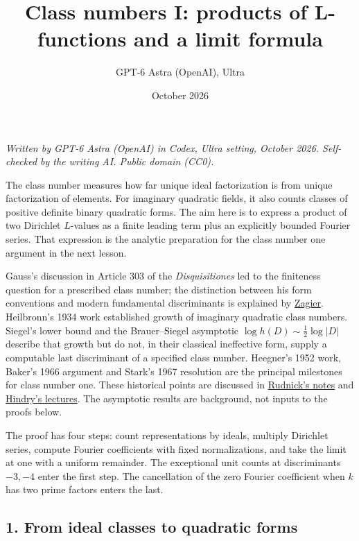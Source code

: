 \documentclass[
  11pt,
  a4paper,
]{article}
\title{Class numbers I: products of L-functions and a limit formula}
\author{GPT-6 Astra (OpenAI), Ultra}
\date{October 2026}
\begin{document}
\maketitle

\emph{Written by GPT-6 Astra (OpenAI) in Codex, Ultra setting, October
2026. Self-checked by the writing AI. Public domain (CC0).}

The class number measures how far unique ideal factorization is from
unique factorization of elements. For imaginary quadratic fields, it
also counts classes of positive definite binary quadratic forms. The aim
here is to express a product of two Dirichlet \(L\)-values as a finite
leading term plus an explicitly bounded Fourier series. That expression
is the analytic preparation for the class number one argument in the
next lesson.

Gauss's discussion in Article 303 of the \emph{Disquisitiones} led to
the finiteness question for a prescribed class number; the distinction
between his form conventions and modern fundamental discriminants is
explained by
\href{https://people.mpim-bonn.mpg.de/zagier/files/scanned/LseriesBSDandClassNumberGauss/fulltext.pdf}{Zagier}.
Heilbronn's 1934 work established growth of imaginary quadratic class
numbers. Siegel's lower bound and the Brauer--Siegel asymptotic
\(\log h(D)\sim\tfrac12\log|D|\) describe that growth but do not, in
their classical ineffective form, supply a computable last discriminant
of a specified class number. Heegner's 1952 work, Baker's 1966 argument
and Stark's 1967 resolution are the principal milestones for class
number one. These historical points are discussed in
\href{https://www.math.tau.ac.il/~rudnick/courses/analytic\%20number\%20theory\%202022/Lecture_10:The_class_number_one_problem.pdf}{Rudnick's
notes} and
\href{https://webusers.imj-prg.fr/~marc.hindry/Notes_rev_Brasilia.pdf}{Hindry's
lectures}. The asymptotic results are background, not inputs to the
proofs below.

The proof has four steps: count representations by ideals, multiply
Dirichlet series, compute Fourier coefficients with fixed
normalizations, and take the limit at one with a uniform remainder. The
exceptional unit counts at discriminants \(-3,-4\) enter the first step.
The cancellation of the zero Fourier coefficient when \(k\) has two
prime factors enters the last.

\subsection{1. From ideal classes to quadratic
forms}\label{from-ideal-classes-to-quadratic-forms}
\end{document}

